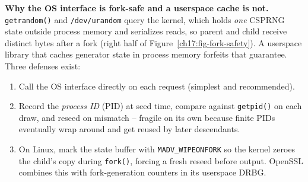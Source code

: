 \begin{whybox}
\textbf{Why the OS interface is fork-safe and a userspace cache is not.} \texttt{getrandom()} and \texttt{/dev/urandom} query the kernel, which holds \emph{one} CSPRNG state outside process memory and serializes reads, so parent and child receive distinct bytes after a fork (right half of Figure~\ref{ch17:fig-fork-safety}). A userspace library that caches generator state in process memory forfeits that guarantee. Three defenses exist:
\begin{enumerate}
  \item Call the OS interface directly on each request (simplest and recommended).
  \item Record the \emph{process ID} (PID) at seed time, compare against \texttt{getpid()} on each draw, and reseed on mismatch -- fragile on its own because finite PIDs eventually wrap around and get reused by later descendants.
  \item On Linux, mark the state buffer with \texttt{MADV\_WIPEONFORK} so the kernel zeroes the child's copy during \texttt{fork()}, forcing a fresh reseed before output. OpenSSL combines this with fork-generation counters in its userspace DRBG.
\end{enumerate}
\end{whybox}

